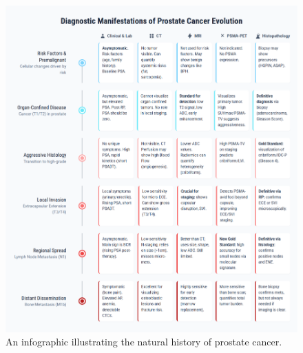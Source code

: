 \documentclass[11pt, a4paper]{article}
\begin{document}
\begin{figure}[H]
\centering
 \includegraphics[width=\textwidth]{pe.png}
 \caption{An infographic illustrating the natural history of prostate cancer.}
\label{fig:prostate_evolution}
\end{figure}
\end{document}
